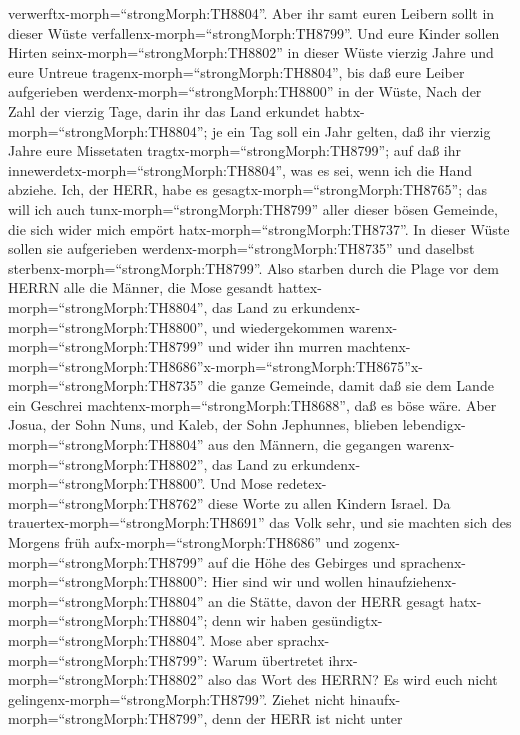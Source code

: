verwerftx-morph=``strongMorph:TH8804''.  Aber ihr samt
euren Leibern sollt in dieser Wüste
verfallenx-morph=``strongMorph:TH8799''.  Und eure Kinder
sollen Hirten seinx-morph=``strongMorph:TH8802'' in dieser Wüste vierzig
Jahre und eure Untreue tragenx-morph=``strongMorph:TH8804'', bis daß
eure Leiber aufgerieben werdenx-morph=``strongMorph:TH8800'' in der
Wüste,  Nach der Zahl der vierzig Tage, darin ihr das Land
erkundet habtx-morph=``strongMorph:TH8804''; je ein Tag soll ein Jahr
gelten, daß ihr vierzig Jahre eure Missetaten
tragtx-morph=``strongMorph:TH8799''; auf daß ihr
innewerdetx-morph=``strongMorph:TH8804'', was es sei, wenn ich die Hand
abziehe.  Ich, der HERR, habe es
gesagtx-morph=``strongMorph:TH8765''; das will ich auch
tunx-morph=``strongMorph:TH8799'' aller dieser bösen Gemeinde, die sich
wider mich empört hatx-morph=``strongMorph:TH8737''. In dieser Wüste
sollen sie aufgerieben werdenx-morph=``strongMorph:TH8735'' und daselbst
sterbenx-morph=``strongMorph:TH8799''.  Also starben durch
die Plage vor dem HERRN alle die Männer, die Mose gesandt
hattex-morph=``strongMorph:TH8804'', das Land zu
erkundenx-morph=``strongMorph:TH8800'', und wiedergekommen
warenx-morph=``strongMorph:TH8799'' und wider ihn murren
machtenx-morph=``strongMorph:TH8686''\textbar x-morph=``strongMorph:TH8675''x-morph=``strongMorph:TH8735''
die ganze Gemeinde,  damit daß sie dem Lande ein Geschrei
machtenx-morph=``strongMorph:TH8688'', daß es böse wäre. 
Aber Josua, der Sohn Nuns, und Kaleb, der Sohn Jephunnes, blieben
lebendigx-morph=``strongMorph:TH8804'' aus den Männern, die gegangen
warenx-morph=``strongMorph:TH8802'', das Land zu
erkundenx-morph=``strongMorph:TH8800''.  Und Mose
redetex-morph=``strongMorph:TH8762'' diese Worte zu allen Kindern
Israel. Da trauertex-morph=``strongMorph:TH8691'' das Volk sehr,
 und sie machten sich des Morgens früh
aufx-morph=``strongMorph:TH8686'' und
zogenx-morph=``strongMorph:TH8799'' auf die Höhe des Gebirges und
sprachenx-morph=``strongMorph:TH8800'': Hier sind wir und wollen
hinaufziehenx-morph=``strongMorph:TH8804'' an die Stätte, davon der HERR
gesagt hatx-morph=``strongMorph:TH8804''; denn wir haben
gesündigtx-morph=``strongMorph:TH8804''.  Mose aber
sprachx-morph=``strongMorph:TH8799'': Warum übertretet
ihrx-morph=``strongMorph:TH8802'' also das Wort des HERRN? Es wird euch
nicht gelingenx-morph=``strongMorph:TH8799''.  Ziehet nicht
hinaufx-morph=``strongMorph:TH8799'', denn der HERR ist nicht unter
